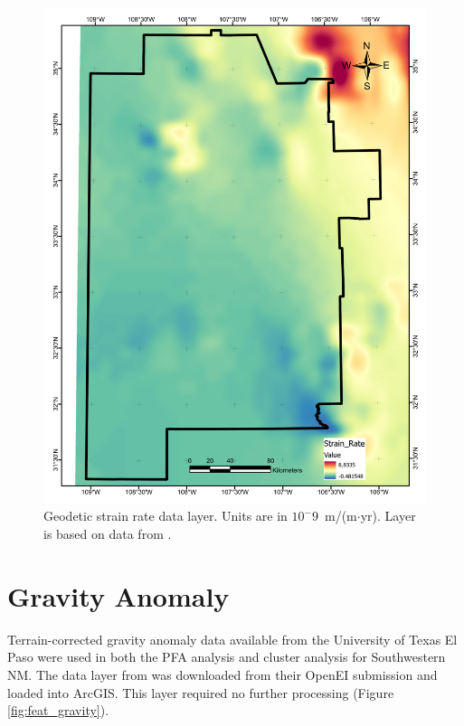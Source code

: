 \begin{figure}[H]
\centering
\includegraphics[width=0.75\linewidth]{templates/images/Figure-StrainRate.pdf}
\caption[Geodetic strain rate data layer]{Geodetic strain rate data layer. Units are in $10^-9$\ m/(m$\cdot$yr). Layer is based on data from \protect\citet{kreemer_geodetic_2014}.}
\label{fig:feat_strain}
\end{figure}
\pagebreak

\section{Gravity Anomaly}\label{app:dl_grav_anomaly}
Terrain-corrected gravity anomaly data available from the University of Texas El Paso \citep{utep_gravity_2011} were used in both the PFA analysis \citep{bielicki_hydrogeolgic_2015} and cluster analysis \citep{pepin_new_2019} for Southwestern NM. The data layer from \citet{bielicki_hydrogeolgic_2015} was downloaded from their OpenEI submission \citep{kelley_geothermal_2015} and loaded into ArcGIS. This layer required no further processing (Figure \ref{fig:feat_gravity}).

